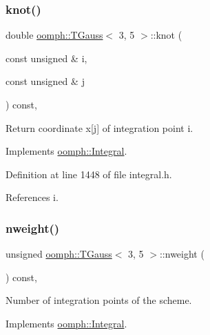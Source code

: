 \subsubsection{\texorpdfstring{knot()}{knot()}}
{\footnotesize\ttfamily double \hyperlink{classoomph_1_1TGauss}{oomph\+::\+T\+Gauss}$<$ 3, 5 $>$\+::knot (\begin{DoxyParamCaption}\item[{const unsigned \&}]{i,  }\item[{const unsigned \&}]{j }\end{DoxyParamCaption}) const\hspace{0.3cm}{\ttfamily [inline]}, {\ttfamily [virtual]}}



Return coordinate x\mbox{[}j\mbox{]} of integration point i. 



Implements \hyperlink{classoomph_1_1Integral_a1a2122f99a87c18649bafdd9ed739758}{oomph\+::\+Integral}.



Definition at line 1448 of file integral.\+h.



References i.

\mbox{\label{classoomph_1_1TGauss_3_013_00_015_01_4_a77baeffc39bfa472a71b410edc8e396c}} 
\subsubsection{\texorpdfstring{nweight()}{nweight()}}
{\footnotesize\ttfamily unsigned \hyperlink{classoomph_1_1TGauss}{oomph\+::\+T\+Gauss}$<$ 3, 5 $>$\+::nweight (\begin{DoxyParamCaption}{ }\end{DoxyParamCaption}) const\hspace{0.3cm}{\ttfamily [inline]}, {\ttfamily [virtual]}}



Number of integration points of the scheme. 



Implements \hyperlink{classoomph_1_1Integral_a1a270de9d99a1fcf1d25a6c1017f65fa}{oomph\+::\+Integral}.



